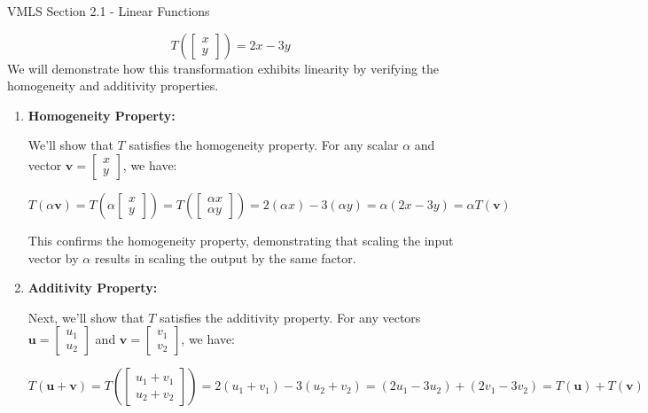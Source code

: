 \begin{notes}{VMLS Section 2.1 - Linear Functions}
\begin{highlight}
        \begin{equation*}
            T\left(\begin{bmatrix} x \\ y \end{bmatrix}\right) = 2x - 3y
        \end{equation*}
        We will demonstrate how this transformation exhibits linearity by verifying the homogeneity and additivity properties.
        
        \begin{enumerate}
            \item \textbf{Homogeneity Property:}
            
            We'll show that \(T\) satisfies the homogeneity property. For any scalar \(\alpha\) and vector \(\mathbf{v} = \begin{bmatrix} x \\ y \end{bmatrix}\), we have:
            
            \[
            T(\alpha\mathbf{v}) = T\left(\alpha\begin{bmatrix} x \\ y \end{bmatrix}\right) = T\left(\begin{bmatrix} \alpha x \\ \alpha y \end{bmatrix}\right) = 2(\alpha x) - 3(\alpha y) = \alpha(2x - 3y) = \alpha T(\mathbf{v})
            \]
            
            This confirms the homogeneity property, demonstrating that scaling the input vector by \(\alpha\) results in scaling the output by the same factor.
            
            \item \textbf{Additivity Property:}
            
            Next, we'll show that \(T\) satisfies the additivity property. For any vectors \(\mathbf{u} = \begin{bmatrix} u_1 \\ u_2 \end{bmatrix}\) and \(\mathbf{v} = \begin{bmatrix} v_1 \\ v_2 \end{bmatrix}\), we have:
            
            \[
            T(\mathbf{u} + \mathbf{v}) = T\left(\begin{bmatrix} u_1 + v_1 \\ u_2 + v_2 \end{bmatrix}\right) = 2(u_1 + v_1) - 3(u_2 + v_2) = (2u_1 - 3u_2) + (2v_1 - 3v_2) = T(\mathbf{u}) + T(\mathbf{v})
            \]
            

\end{enumerate}
\end{highlight}
\end{notes}
